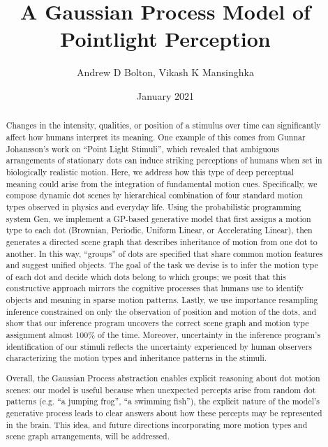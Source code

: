 \documentclass[12pt, letterpaper]{article}
\title{A Gaussian Process Model of Pointlight Perception}
\author{Andrew D Bolton, Vikash K Mansinghka}
\date{January 2021}
\begin{document}
\maketitle

\begin{abstract}
  Changes in the intensity, qualities, or position of a stimulus over time can significantly affect how humans interpret its meaning. One example of this comes from Gunnar Johansson's work on ``Point Light Stimuli'', which revealed that ambiguous arrangements of stationary dots can induce striking perceptions of humans when set in biologically realistic motion. Here, we address how this type of deep perceptual meaning could arise from the integration of fundamental motion cues. Specifically, we compose dynamic dot scenes by hierarchical combination of four standard motion types observed in physics and everyday life. Using the probabilistic programming system Gen, we implement a GP-based generative model that first assigns a motion type to each dot (Brownian, Periodic, Uniform Linear, or Accelerating Linear), then generates a directed scene graph that describes inheritance of motion from one dot to another. In this way, ``groups'' of dots are specified that share common motion features and suggest unified objects. The goal of the task we devise is to infer the motion type of each dot and decide which dots belong to which groups; we posit that this constructive approach mirrors the cognitive processes that humans use to identify objects and meaning in sparse motion patterns. Lastly, we use importance resampling inference constrained on only the observation of position and motion of the dots, and show that our inference program uncovers the correct scene graph and motion type assignment almost 100\% of the time. Moreover, uncertainty in the inference program's identification of our stimuli reflects the uncertainty experienced by human observers characterizing the motion types and inheritance patterns in the stimuli.

  Overall, the Gaussian Process abstraction enables explicit reasoning about dot motion scenes: our model is useful because when unexpected percepts arise from random dot patterns (e.g. ``a jumping frog'', ``a swimming fish''), the explicit nature of the model's generative process leads to clear answers about how these percepts may be represented in the brain. This idea, and future directions incorporating more motion types and scene graph arrangements, will be addressed. 




\end{abstract}
\end{document}
